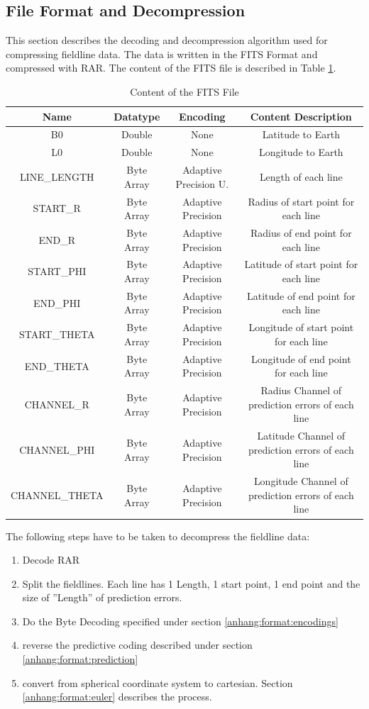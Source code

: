 \subsection{File Format and Decompression}
This section describes the decoding and decompression algorithm used for compressing fieldline data. The data is written in the FITS Format \cite{website:fits} and compressed with RAR. The content of the FITS file is described in Table \ref{anhang:format:content}.\\
\begin{table}[!htbp]
\center
\begin{tabular}{|c|c|c|c|}
	\hline
	Name  & Datatype & Encoding& Content Description	\\\hline
    B0 & Double & None & Latitude to Earth\\
    L0 & Double& None& Longitude to Earth\\
    LINE\_LENGTH &Byte Array & Adaptive Precision U. & Length of each line\\
    START\_R & Byte Array & Adaptive Precision & Radius of start point for each line\\
    END\_R & Byte Array & Adaptive Precision & Radius of end point for each line\\
    START\_PHI & Byte Array & Adaptive Precision & Latitude of start point for each line\\
    END\_PHI & Byte Array & Adaptive Precision & Latitude of end point for each line\\
    START\_THETA & Byte Array & Adaptive Precision & Longitude of start point for each line\\
    END\_THETA & Byte Array & Adaptive Precision & Longitude of end point for each line\\
    CHANNEL\_R & Byte Array & Adaptive Precision & Radius Channel of prediction errors of each line\\
    CHANNEL\_PHI & Byte Array & Adaptive Precision & Latitude Channel of prediction errors of each line\\
    CHANNEL\_THETA & Byte Array & Adaptive Precision & Longitude Channel of prediction errors of each line\\\hline
\end{tabular}
\caption{Content of the FITS File}
\label{anhang:format:content}
\end{table}
The following steps have to be taken to decompress the fieldline data:
\begin{enumerate}
	\item Decode RAR
	\item Split the fieldlines. Each line has 1 Length, 1 start point, 1 end point and the size of ''Length'' of prediction errors.
	\item Do the Byte Decoding specified under section \ref{anhang:format:encodings}
	\item reverse the predictive coding described under section \ref{anhang:format:prediction}
	\item convert from spherical coordinate system to cartesian. Section \ref{anhang:format:euler} describes the process.
\end{enumerate}

